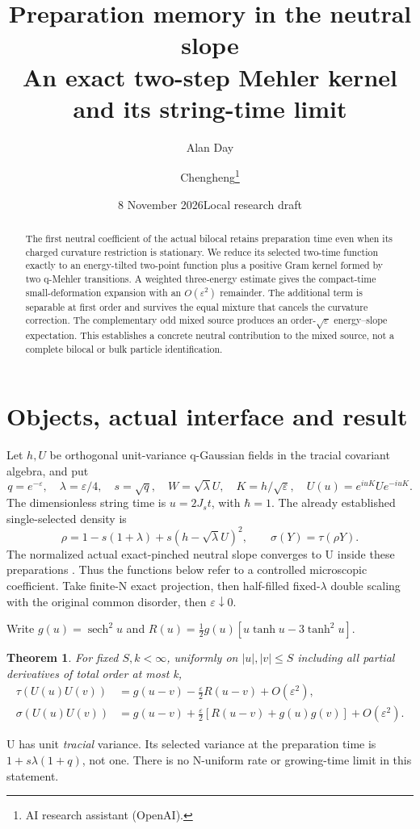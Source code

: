 \documentclass[11pt]{article}
\title{Preparation memory in the neutral slope\\
\large An exact two-step Mehler kernel and its string-time limit}
\author{Alan Day \and Chengheng\thanks{AI research assistant (OpenAI).}}
\date{8 November 2026\quad Local research draft}
\newcommand{\eps}{\varepsilon}
\newcommand{\sech}{\operatorname{sech}}
\newcommand{\tr}{\tau}
\newtheorem{theorem}{Theorem}
\begin{document}
\maketitle
\begin{abstract}
The first neutral coefficient of the actual bilocal retains
preparation time even when its charged curvature restriction is
stationary. We reduce its selected two-time function exactly to an
energy-tilted two-point function plus a positive Gram kernel formed
by two q-Mehler transitions. A weighted three-energy estimate gives
the compact-time small-deformation expansion with an
$O(\varepsilon^2)$ remainder. The additional term is separable at
first order and survives the equal mixture that cancels the
curvature correction. The complementary odd mixed source produces
an order-$\sqrt{\varepsilon}$ energy--slope expectation.
This establishes a concrete neutral
contribution to the mixed source, not a complete bilocal or bulk
particle identification.
\end{abstract}

\section{Objects, actual interface and result}
Let $h,U$ be orthogonal unit-variance q-Gaussian fields in the
tracial covariant algebra, and put
\[
 q=e^{-\eps},\quad \lambda=\eps/4,\quad s=\sqrt q,\quad
 W=\sqrt\lambda U,\quad K=h/\sqrt\eps,\quad U(u)=e^{iuK}Ue^{-iuK}.
\]
The dimensionless string time is $u=2J_st$, with $\hbar=1$.
The already established single-selected density \cite{selected} is
\begin{equation}\label{density}
 \rho=1-s(1+\lambda)+s(h-\sqrt\lambda U)^2,\qquad
 \sigma(Y)=\tr(\rho Y).
\end{equation}
The normalized actual exact-pinched neutral slope converges to U
inside these preparations \cite{actual}. Thus the functions below
refer to a controlled microscopic coefficient. Take finite-N exact
projection, then half-filled fixed-$\lambda$ double scaling with
the original common disorder, then $\eps\downarrow0$.

Write $g(u)=\sech^2u$ and
$R(u)=\tfrac12g(u)[u\tanh u-3\tanh^2u]$.
\begin{theorem}\label{main}
For fixed $S,k<\infty$, uniformly on $|u|,|v|\le S$ including
all partial derivatives of total order at most k,
\begin{align}
 \tr(U(u)U(v))&=g(u-v)-\tfrac{\eps}{2}R(u-v)+O(\eps^2),\nonumber\\
 \sigma(U(u)U(v))&=g(u-v)+\tfrac{\eps}{2}
       [R(u-v)+g(u)g(v)]+O(\eps^2).\label{result}
\end{align}
\end{theorem}
U has unit \emph{tracial} variance. Its selected variance at the
preparation time is $1+s\lambda(1+q)$, not one.
There is no N-uniform rate or growing-time limit in this statement.
\end{document}
